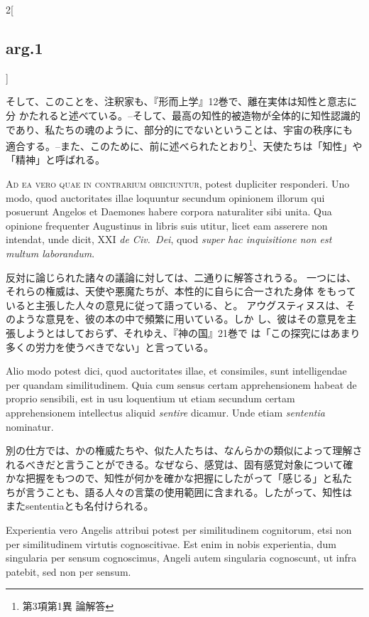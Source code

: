 \documentclass[paper=a4paper,fontsize=10pt,jafontsize=9pt,titlepage]{jlreq}
\begin{document}
\begin{paracol}{2}[\subsection{arg.1}]
\switchcolumn

そして、このことを、注釈家も、『形而上学』12巻で、離在実体は知性と意志に分
 かたれると述べている。--そして、最高の知性的被造物が全体的に知性認識的
 であり、私たちの魂のように、部分的にでないということは、宇宙の秩序にも
 適合する。--また、このために、前に述べられたとおり\footnote{第3項第1異
 論解答}、天使たちは「知性」や「精神」と呼ばれる。

\switchcolumn*

{\scshape Ad ea vero quae in contrarium obiiciuntur},
potest dupliciter responderi. Uno modo, quod auctoritates illae
loquuntur secundum opinionem illorum qui posuerunt Angelos et Daemones
habere corpora naturaliter sibi unita. Qua opinione frequenter
Augustinus in libris suis utitur, licet eam asserere non intendat, unde
dicit, XXI {\itshape de Civ.~Dei}, quod {\itshape super hac inquisitione
 non est multum laborandum}.

\switchcolumn

反対に論じられた諸々の議論に対しては、二通りに解答されうる。
一つには、それらの権威は、天使や悪魔たちが、本性的に自らに合一された身体
 をもっていると主張した人々の意見に従って語っている、と。
アウグスティヌスは、そのような意見を、彼の本の中で頻繁に用いている。しか
 し、彼はその意見を主張しようとはしておらず、それゆえ、『神の国』21巻で
 は「この探究にはあまり多くの労力を使うべきでない」と言っている。

\switchcolumn*

Alio modo potest dici, quod auctoritates illae, et
consimiles, sunt intelligendae per quandam similitudinem. Quia cum
sensus certam apprehensionem habeat de proprio sensibili, est in usu
loquentium ut etiam secundum certam apprehensionem intellectus aliquid
{\itshape sentire} dicamur. Unde etiam {\itshape sententia} nominatur.

\switchcolumn

別の仕方では、かの権威たちや、似た人たちは、なんらかの類似によって理解さ
 れるべきだと言うことができる。なぜなら、感覚は、固有感覚対象について確
 かな把握をもつので、知性が何かを確かな把握にしたがって「感じる」と私た
 ちが言うことも、語る人々の言葉の使用範囲に含まれる。したがって、知性は
 またsententiaとも名付けられる。

\switchcolumn*

Experientia vero
Angelis attribui potest per similitudinem cognitorum, etsi non per
similitudinem virtutis cognoscitivae. 
Est enim in nobis experientia, dum
singularia per sensum cognoscimus, Angeli autem singularia cognoscunt,
ut infra patebit, sed non per sensum.


\end{paracol}
\end{document}
